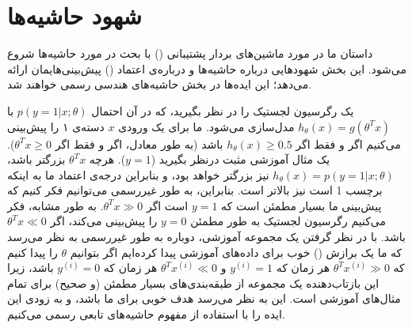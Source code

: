 \documentclass[12pt]{article}
\begin{document}
\fontsize{12pt}{14pt}\selectfont




\section{شهود حاشیه‌ها}
داستان ما در مورد ماشین‌های بردار پشتیبانی
()
با بحث در مورد حاشیه‌ها شروع می‌شود. این بخش شهودهایی درباره حاشیه‌ها و درباره‌ی اعتماد
()
پیش‌بینی‌هایمان ارائه می‌دهد؛ این ایده‌ها در بخش حاشیه‌های هندسی رسمی خواهند شد.

یک رگرسیون لجستیک را در نظر بگیرید، که در آن احتمال
$p(y = 1 | x; \theta)$
با
$h_{\theta}(x) = g(\theta^T x)$
مدل‌سازی می‌شود. ما برای یک ورودی
$x$
دسته‌ی ۱ را پیش‌بینی می‌کنیم اگر و فقط اگر
$h_{\theta}(x) \geq 0.5$
باشد (به طور معادل، اگر و فقط اگر
$\theta^T x \geq 0$).
یک مثال آموزشی مثبت درنظر بگیرید
($y = 1$).
هرچه
$\theta^T x$
بزرگتر باشد،
$h_{\theta}(x) = p(y = 1 | x; \theta)$
نیز بزرگتر خواهد بود، و بنابراین درجه‌ی اعتماد ما به اینکه برچسب 1 است نیز بالاتر است. بنابراین، به طور غیررسمی می‌توانیم فکر کنیم که پیش‌بینی ما بسیار مطمئن است که
$y = 1$
است اگر
$\theta^T x \gg 0$.
به طور مشابه، فکر می‌کنیم رگرسیون لجستیک به طور مطمئن
$y = 0$
را پیش‌بینی می‌کند، اگر
$\theta^T x \ll 0$
باشد. با در نظر گرفتن یک مجموعه آموزشی، دوباره به طور غیررسمی به نظر می‌رسد که ما یک برازش
()
خوب برای داده‌های آموزشی پیدا کرده‌ایم اگر بتوانیم
$\theta$
را پیدا کنیم که
$\theta^T x^{(i)} \gg 0$
هر زمان که
$y^{(i)} = 1$
و
$\theta^T x^{(i)} \ll 0$
هر زمان که
$y^{(i)} = 0$
باشد، زیرا این بازتاب‌دهنده یک مجموعه از طبقه‌بندی‌های بسیار مطمئن (و صحیح) برای تمام مثال‌های آموزشی است. این به نظر می‌رسد هدف خوبی برای ما باشد، و به زودی این ایده را با استفاده از مفهوم حاشیه‌های تابعی رسمی می‌کنیم.
\end{document}
